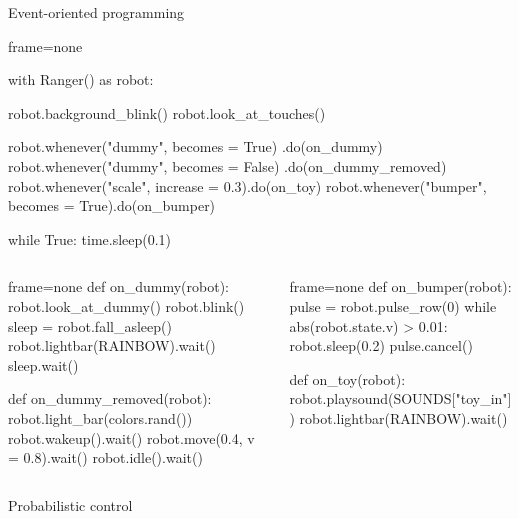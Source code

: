 \documentclass[compress]{beamer}
\begin{document}
\begin{frame}[fragile]{Event-oriented programming}
\begin{overprint}
\begin{pythoncode*}{frame=none}

with Ranger() as robot:

    robot.background_blink()
    robot.look_at_touches()

    robot.whenever("dummy", becomes = True)
                                .do(on_dummy)
    robot.whenever("dummy", becomes = False)
                                .do(on_dummy_removed)
    robot.whenever("scale", increase = 0.3).do(on_toy)
    robot.whenever("bumper", becomes = True).do(on_bumper)

    while True:
        time.sleep(0.1)
\end{pythoncode*}

    
    
    \begin{columns}
        \begin{column}{0.45\linewidth}
            \begin{pythoncode*}{frame=none}
def on_dummy(robot):
    robot.look_at_dummy()
    robot.blink()
    sleep = robot.fall_asleep()
    robot.lightbar(RAINBOW).wait()
    sleep.wait()

def on_dummy_removed(robot):
    robot.light_bar(colors.rand())
    robot.wakeup().wait()
    robot.move(0.4, v = 0.8).wait()
    robot.idle().wait()

\end{pythoncode*}
\end{column}
        \begin{column}{0.55\linewidth}
\begin{pythoncode*}{frame=none}
def on_bumper(robot):
    pulse = robot.pulse_row(0)
    while abs(robot.state.v) > 0.01:
        robot.sleep(0.2)
    pulse.cancel()

def on_toy(robot):
    robot.playsound(SOUNDS["toy_in"])
    robot.lightbar(RAINBOW).wait()
\end{pythoncode*}
        \end{column}
    \end{columns}
\end{overprint}
\end{frame}

\begin{frame}{Probabilistic control}
\end{frame}
\end{document}
